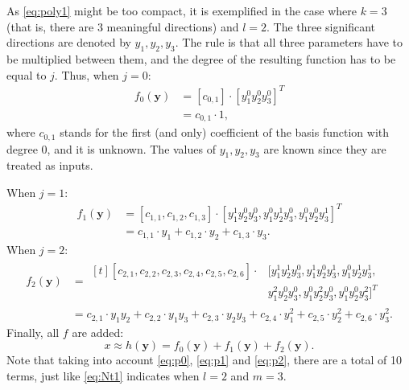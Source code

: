 As \eqref{eq:poly1} might be too compact, it is exemplified in the case where $k=3$ (that is, there are 3 meaningful directions) and $l=2$. The three significant directions are denoted by $y_1, y_2, y_3$. The rule is that all three parameters have to be multiplied between them, and the degree of the resulting function has to be equal to $j$. Thus, when $j=0$:
\begin{equation}
  \begin{split}
    f_0(\mathbf{y}) &= [c_{0,1}] \cdot \left[y_1^0 y_2^0 y_3^0\right]^T\\
        &= c_{0,1} \cdot 1,
  \end{split}
  \label{eq:p0}
\end{equation}
where $c_{0,1}$ stands for the first (and only) coefficient of the basis function with degree 0, and it is unknown. The values of $y_1, y_2, y_3$ are known since they are treated as inputs. 

When $j=1$:
\begin{equation}
  \begin{split}
    f_1(\mathbf{y}) &= [c_{1,1}, c_{1,2}, c_{1,3}] \cdot \left[y_1^1 y_2^0 y_3^0, y_1^0 y_2^1 y_3^0, y_1^0 y_2^0 y_3^1 \right]^T\\
        &= c_{1,1}\cdot y_1 + c_{1,2}\cdot y_2 + c_{1,3}\cdot y_3.
  \end{split}
  \label{eq:p1}
\end{equation}
When $j=2$:
\begin{equation}
  \begin{aligned}
    f_2(\mathbf{y}) &= \begin{aligned}[t]
                [c_{2,1}, c_{2,2}, c_{2,3}, c_{2,4}, c_{2,5}, c_{2,6}] \cdot & \big[y_1^1 y_2^1 y_3^0, y_1^1 y_2^0 y_3^1, y_1^0 y_2^1 y_3^1, \\
               & y_1^2 y_2^0 y_3^0, y_1^0 y_2^2 y_3^0, y_1^0 y_2^0 y_3^2 \big]^T
    \end{aligned}
    \\
        &=  c_{2,1} \cdot y_1 y_2 + c_{2,2} \cdot y_1 y_3 + c_{2,3} \cdot y_2 y_3 + c_{2,4} \cdot y_1^2 + c_{2,5} \cdot y_2^2 + c_{2,6} \cdot y_3^2.
  \end{aligned}
  \label{eq:p2}
\end{equation}
Finally, all $f$ are added:
\begin{equation}
  x \approx h(\mathbf{y}) = f_0(\mathbf{y}) + f_1(\mathbf{y}) + f_2(\mathbf{y}).
  \label{eq:hfinal}
\end{equation}
Note that taking into account \eqref{eq:p0}, \eqref{eq:p1} and \eqref{eq:p2}, there are a total of 10 terms, just like \eqref{eq:Nt1} indicates when $l=2$ and $m=3$. 

